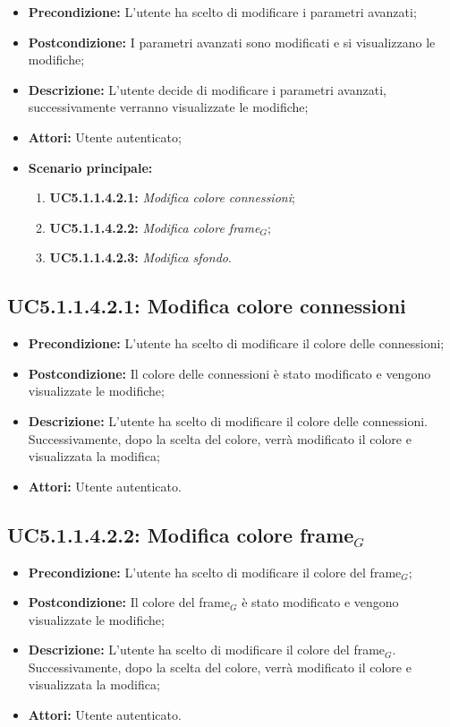 \begin{itemize}
	\item \textbf{Precondizione:} L'utente ha scelto di modificare i parametri avanzati;
	\item \textbf{Postcondizione:} I parametri avanzati sono modificati e si visualizzano le modifiche;
	\item \textbf{Descrizione:} L'utente decide di modificare i parametri avanzati, successivamente verranno visualizzate le modifiche;
	\item \textbf{Attori:} Utente autenticato;
	\item \textbf{Scenario principale:}
	\begin{enumerate}
		\item \textbf{ UC5.1.1.4.2.1:} \textit{ Modifica colore connessioni};
		\item \textbf{ UC5.1.1.4.2.2:} \textit{ Modifica colore frame$_G$};
		\item \textbf{ UC5.1.1.4.2.3:} \textit{ Modifica sfondo}.
	\end{enumerate}
\end{itemize}
\subsection{ UC5.1.1.4.2.1: Modifica colore connessioni}

\begin{itemize}
	\item \textbf{Precondizione:} L'utente ha scelto di modificare il colore delle connessioni;
	\item \textbf{Postcondizione:} Il colore delle connessioni è stato modificato e vengono visualizzate le modifiche;
	\item \textbf{Descrizione:} L'utente ha scelto di modificare il colore delle connessioni.  Successivamente, dopo la scelta del colore, verrà modificato il colore e visualizzata la modifica;
	\item \textbf{Attori:} Utente autenticato.
\end{itemize}
\subsection{ UC5.1.1.4.2.2: Modifica colore frame$_G$}

\begin{itemize}
	\item \textbf{Precondizione:} L'utente ha scelto di modificare il colore del frame$_G$;
	\item \textbf{Postcondizione:} Il colore del frame$_G$ è stato modificato e vengono visualizzate le modifiche;
	\item \textbf{Descrizione:} L'utente ha scelto di modificare il colore del frame$_G$.  Successivamente, dopo la scelta del colore, verrà modificato il colore e visualizzata la modifica;
	\item \textbf{Attori:} Utente autenticato.
\end{itemize}
